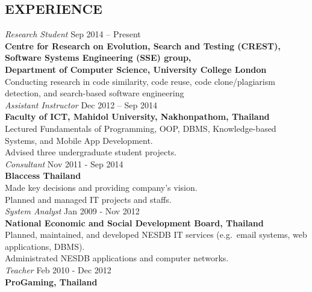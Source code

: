 \documentclass[margin, 10pt]{res} %
\begin{document}
\begin{resume}
\newpage
 
\section{EXPERIENCE}

{\sl Research Student} \hfill Sep 2014 -- Present \\
\textbf{Centre for Research on Evolution, Search and Testing (CREST), \\ Software Systems Engineering (SSE) group, \\ Department of Computer Science, University College London}\\
Conducting research in code similarity, code reuse, code clone/plagiarism detection, and search-based software engineering \vspace{4mm} \\
{\sl Assistant Instructor} \hfill Dec 2012 -- Sep 2014 \\
\textbf{Faculty of ICT, Mahidol University, Nakhonpathom, Thailand} \\
Lectured Fundamentals of Programming, OOP, DBMS, Knowledge-based Systems, and Mobile App Development. \\
Advised three undergraduate student projects. \vspace{3mm} \\
{\sl Consultant} \hfill Nov 2011 - Sep 2014 \\
\textbf{Blaccess Thailand} \\
Made key decisions and providing company's vision. \\
Planned and managed IT projects and staffs. \vspace{3mm} \\
{\sl System Analyst} \hfill Jan 2009 - Nov 2012\\
\textbf{National Economic and Social Development Board, Thailand}\\
Planned, maintained, and developed NESDB IT services (e.g.~email systems, web applications, DBMS).\\
Administrated NESDB applications and computer networks. \vspace{3mm} \\
{\sl Teacher} \hfill Feb 2010 - Dec 2012 \\
\textbf{ProGaming, Thailand}\\

\end{resume}
\end{document}
